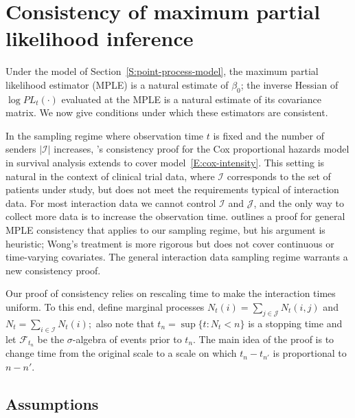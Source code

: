 \documentclass[final]{statsoc}
\begin{document}
\section{Consistency of maximum partial likelihood inference}
\label{S:MPLE-consistency}

Under the model of Section~\ref{S:point-process-model}, the maximum partial likelihood estimator (MPLE) is a natural
estimate of $\beta_0$; the inverse Hessian of $\log \mathit{PL}_t(\cdot)$
evaluated at the MPLE is a natural estimate of its covariance matrix.
We now give conditions under which these
estimators are consistent.

In the sampling regime where observation time $t$ is fixed and the number of
senders $|\mathcal{I}|$ increases, 's \citeyearpar{andersen1982cox} consistency proof for
the Cox proportional hazards model in survival analysis extends
to cover model~\eqref{E:cox-intensity}.  This setting is natural in the
context of clinical trial data, where $\mathcal{I}$ corresponds to the set of
patients under study, but does not meet the requirements typical of
interaction data.  For most interaction
data we cannot control $\mathcal{I}$ and $\mathcal{J}$, and the only way to
collect more data is to increase the observation time.  \citet{cox1972regression,cox1975partial} outlines a proof for general
MPLE consistency that applies to our sampling regime, but his argument is
heuristic; Wong's \citeyearpar{wong1986theory} treatment is more rigorous but does not cover continuous or
time-varying covariates. The general
interaction data sampling regime warrants a new consistency proof.

Our proof of consistency relies on rescaling time to make the interaction
times uniform.  To this end, define marginal processes
\(
    N_t(i) = \sum_{j \in \mathcal{J}} N_t(i,j)
\)
and
\(
    N_t = \sum_{i \in \mathcal{I}} N_t(i);
\)
also note that $t_n = \sup\{ t : N_t < n \}$ is a stopping time
and let $\mathcal{F}_{t_n}$ be the $\sigma$-algebra of events prior to
$t_n$. The main idea of the proof is to change time from the original scale
to a scale on which $t_{n} - t_{n'}$ is proportional to $n - n'$.

\subsection{Assumptions}
\end{document}
